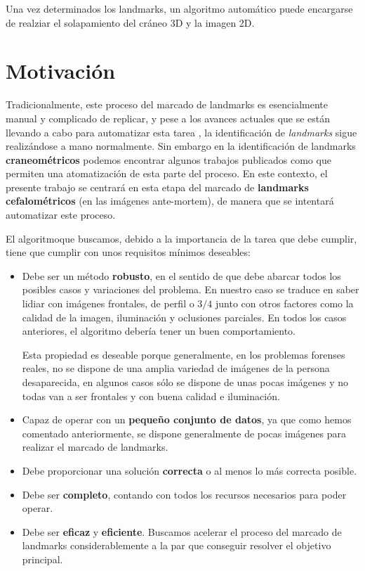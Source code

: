 \medskip 

\noindent Una vez determinados los landmarks, un algoritmo automático puede encargarse de realziar el solapamiento del cráneo 3D y la imagen 2D.

\section{Motivación}

Tradicionalmente, este proceso del marcado de landmarks es esencialmente manual y complicado de replicar, y pese a los avances actuales que se están llevando a cabo para automatizar esta tarea \cite{Huete2015PastPA}, la identificación de \textit{landmarks} sigue realizándose a mano normalmente. Sin embargo en la identificación de landmarks \textbf{craneométricos} podemos encontrar algunos trabajos publicados como \cite{bermejo2021automatic} que permiten una atomatización de esta parte del proceso. En este contexto, el presente trabajo se centrará en esta etapa del marcado de \textbf{landmarks cefalométricos} (en las imágenes ante-mortem), de manera que se intentará automatizar este proceso.

\medskip

\noindent El algoritmoque buscamos, debido a la importancia de la tarea que debe cumplir, tiene que cumplir con unos requisitos mínimos deseables: 

\begin{itemize}
    \item Debe ser un método \textbf{robusto}, en el sentido de que debe abarcar todos los posibles casos y variaciones del problema. En nuestro caso se traduce en saber lidiar con imágenes frontales, de perfil o $3/4$ junto con otros factores como la calidad de la imagen, iluminación y oclusiones parciales. En todos los casos anteriores, el algoritmo debería tener un buen comportamiento.
    
    \medskip

    \noindent Esta propiedad es deseable porque generalmente, en los problemas forenses reales, no se dispone de una amplia variedad de imágenes de la persona desaparecida, en algunos casos sólo se dispone de unas pocas imágenes y no todas van a ser frontales y con buena calidad e iluminación.

    \item Capaz de operar con un \textbf{pequeño conjunto de datos}, ya que como hemos comentado anteriormente, se dispone generalmente de pocas imágenes para realizar el marcado de landmarks.
    \item Debe proporcionar una solución \textbf{correcta} o al menos lo más correcta posible.  
    \item Debe ser \textbf{completo}, contando con todos los recursos necesarios para poder operar.
    \item Debe ser \textbf{eficaz} y \textbf{eficiente}. Buscamos acelerar el proceso del marcado de landmarks considerablemente a la par que conseguir resolver el objetivo principal.
\end{itemize}

